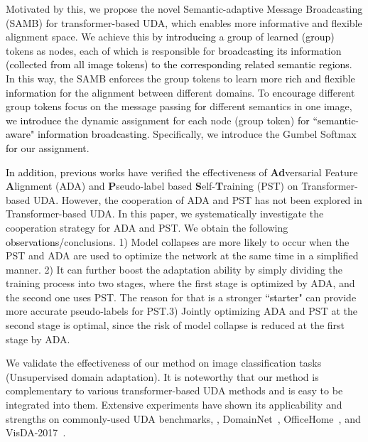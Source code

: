 \documentclass[journal]{IEEEtran}
\newcommand{\tcb}{\textcolor{black}}
\begin{document}
Motivated by this, we propose the novel Semantic-adaptive Message Broadcasting (SAMB)
for transformer-based UDA, which enables more informative and flexible alignment space. 
We achieve this by \tcb{introducing} a group of learned \tcb{(group)} tokens as nodes, each of which is responsible for \tcb{broadcasting its information (collected from all image tokens) to the corresponding related semantic regions}.
In this way, the SAMB enforces the group tokens to learn more \tcb{rich} and flexible \tcb{information} for the alignment between different domains. To \tcb{encourage} different group tokens focus on the message passing \tcb{for} different semantics in one image, we \tcb{introduce} the dynamic assignment for each node (group token) \tcb{for ``semantic-aware" information broadcasting}. Specifically, we introduce the Gumbel Softmax~\cite{jang2016categoricalGumbelsoftmax} \tcb{for} our assignment. 






\tcb{In addition, p}revious works have verified the effectiveness of \textbf{Ad}versarial Feature \textbf{A}lignment (ADA) and \textbf{P}seudo-label based \textbf{S}elf-\textbf{T}raining (PST) on Transformer-based UDA. However, the cooperation of ADA and PST has not been explored in Transformer-based UDA. In this paper, we systematically investigate the cooperation strategy for ADA and PST. We obtain the following \tcb{observations/}conclusions. 
 1) Model collapses are more likely to occur when the PST and ADA are used to optimize the network at the same time in a simplified manner. 2) It can further boost the adaptation ability by simply dividing the training process into two stages, where the first stage is optimized by ADA, and the second one uses PST. The reason for that is a stronger \tcb{``starter"} can provide more accurate pseudo-labels for PST.3) Jointly optimizing ADA and PST at the second stage is optimal, since the risk of model collapse is reduced at the first stage by ADA.  


We validate the effectiveness of our method on image classification tasks (Unsupervised domain adaptation). It is noteworthy that our method is complementary to various transformer-based UDA methods and is easy to be integrated into them. Extensive experiments have shown its applicability and strengths on commonly-used UDA benchmarks, \ieno, DomainNet~\cite{peng2019momentDomainNet}, OfficeHome~\cite{venkateswara2017deepOffice-Home}, and VisDA-2017~\cite{peng2017visdaViSDA2017}. 
\end{document}
